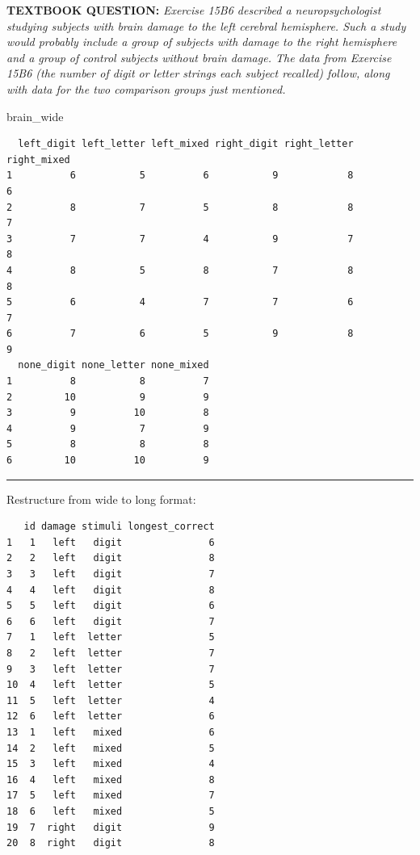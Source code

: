 \documentclass[]{article}
\newenvironment{Shaded}{\begin{snugshade}}{\end{snugshade}}
\newcommand{\NormalTok}[1]{#1}
\begin{document}
\textbf{TEXTBOOK QUESTION:} \emph{Exercise 15B6 described a
neuropsychologist studying subjects with brain damage to the left
cerebral hemisphere. Such a study would probably include a group of
subjects with damage to the right hemisphere and a group of control
subjects without brain damage. The data from Exercise 15B6 (the number
of digit or letter strings each subject recalled) follow, along with
data for the two comparison groups just mentioned.}

\begin{Shaded}
\begin{Highlighting}[]
\NormalTok{brain_wide}
\end{Highlighting}
\end{Shaded}

\begin{verbatim}
  left_digit left_letter left_mixed right_digit right_letter right_mixed
1          6           5          6           9            8           6
2          8           7          5           8            8           7
3          7           7          4           9            7           8
4          8           5          8           7            8           8
5          6           4          7           7            6           7
6          7           6          5           9            8           9
  none_digit none_letter none_mixed
1          8           8          7
2         10           9          9
3          9          10          8
4          9           7          9
5          8           8          8
6         10          10          9
\end{verbatim}

\begin{center}\rule{0.5\linewidth}{\linethickness}\end{center}

Restructure from wide to long format:

\begin{verbatim}
   id damage stimuli longest_correct
1   1   left   digit               6
2   2   left   digit               8
3   3   left   digit               7
4   4   left   digit               8
5   5   left   digit               6
6   6   left   digit               7
7   1   left  letter               5
8   2   left  letter               7
9   3   left  letter               7
10  4   left  letter               5
11  5   left  letter               4
12  6   left  letter               6
13  1   left   mixed               6
14  2   left   mixed               5
15  3   left   mixed               4
16  4   left   mixed               8
17  5   left   mixed               7
18  6   left   mixed               5
19  7  right   digit               9
20  8  right   digit               8
\end{verbatim}
\end{document}
